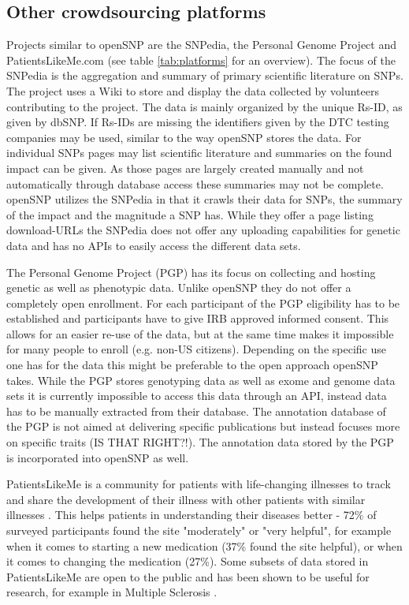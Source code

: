 \documentclass[10pt]{article}
\begin{document}
\subsection*{Other crowdsourcing platforms}
Projects similar to openSNP are the SNPedia, the Personal Genome Project and PatientsLikeMe.com (see table \ref{tab:platforms} for an overview). The focus of the SNPedia is the aggregation and summary of primary scientific literature on SNPs. The project uses a Wiki to store and display the data collected by volunteers contributing to the project. The data is mainly organized by the unique Rs-ID, as given by dbSNP. If Rs-IDs are missing the identifiers given by the DTC testing companies may be used, similar to the way openSNP stores the data. For individual SNPs pages may list scientific literature and summaries on the found impact can be given. As those pages are largely created manually and not automatically through database access these summaries may not be complete. openSNP utilizes the SNPedia in that it crawls their data for SNPs, the summary of the impact and the magnitude a SNP has. While they offer a page listing download-URLs the SNPedia does not offer any uploading capabilities for genetic data and has no APIs to easily access the different data sets.

The Personal Genome Project (PGP) has its focus on collecting and hosting genetic as well as phenotypic data. Unlike openSNP they do not offer a completely open enrollment. For each participant of the PGP eligibility has to be established and participants have to give IRB approved informed consent. This allows for an easier re-use of the data, but at the same time makes it impossible for many people to enroll (e.g. non-US citizens). Depending on the specific use one has for the data this might be preferable to the open approach openSNP takes. While the PGP stores genotyping data as well as exome and genome data sets it is currently impossible to access this data through an API, instead data has to be manually extracted from their database. The annotation database of the PGP is not aimed at delivering specific publications but instead focuses more on specific traits (IS THAT RIGHT?!). The  annotation data stored by the PGP is incorporated into openSNP as well. 

PatientsLikeMe is a community for patients with life-changing illnesses to track and share the development of their illness with other patients with similar illnesses \cite{Wicks2010}.  This helps patients in understanding their diseases better - 72\% of surveyed participants found the site "moderately" or "very helpful", for example when it comes to starting a new medication (37\% found the site helpful), or when it comes to changing the medication (27\%). Some subsets of data stored in PatientsLikeMe are open to the public and has been shown to be useful for research, for example in Multiple Sclerosis \cite{Bove2013}.
\end{document}
